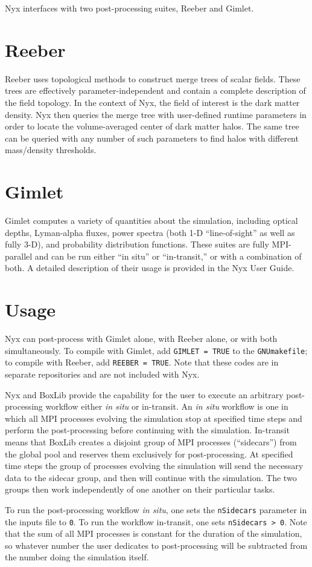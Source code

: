 Nyx interfaces with two post-processing suites, Reeber and Gimlet.

\section{Reeber}

Reeber uses topological methods to construct merge trees of scalar fields.
These trees are effectively parameter-independent and contain a complete
description of the field topology. In the context of Nyx, the field of interest
is the dark matter density. Nyx then queries the merge tree with user-defined
runtime parameters in order to locate the volume-averaged center of dark matter
halos. The same tree can be queried with any number of such parameters to find
halos with different mass/density thresholds.

\section{Gimlet}

Gimlet computes a variety of quantities about the simulation, including optical
depths, Lyman-alpha fluxes, power spectra (both 1-D ``line-of-sight'' as well as
fully 3-D), and probability distribution functions. These suites are fully
MPI-parallel and can be run either ``in situ'' or ``in-transit,'' or with a
combination of both. A detailed description of their usage is provided in the
Nyx User Guide.

\section{Usage}

Nyx can post-process with Gimlet alone, with Reeber alone, or with both
simultaneously. To compile with Gimlet, add \texttt{GIMLET = TRUE} to the
\texttt{GNUmakefile}; to compile with Reeber, add \texttt{REEBER = TRUE}. Note
that these codes are in separate repositories and are not included with Nyx.

Nyx and BoxLib provide the capability for the user to execute an arbitrary
post-processing workflow either \textit{in situ} or in-transit. An \textit{in
situ} workflow is one in which all MPI processes evolving the simulation stop
at specified time steps and perform the post-processing before continuing with
the simulation. In-transit means that BoxLib creates a disjoint group of MPI
processes (``sidecars'') from the global pool and reserves them exclusively for
post-processing. At specified time steps the group of processes evolving the
simulation will send the necessary data to the sidecar group, and then will
continue with the simulation. The two groups then work independently of one
another on their particular tasks.

To run the post-processing workflow \textit{in situ}, one sets the
\texttt{nSidecars} parameter in the inputs file to \texttt{0}. To run the
workflow in-transit, one sets \texttt{nSidecars > 0}. Note that the sum of all
MPI processes is constant for the duration of the simulation, so whatever
number the user dedicates to post-processing will be subtracted from the number
doing the simulation itself.
